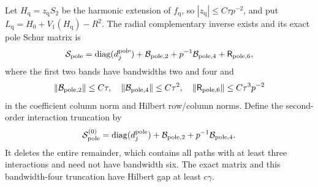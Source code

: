 \begin{lemma}\label{inf:centre-form-comparison}
Let $H_{\mathrm q}=z_{\mathrm q}S_2$ be the harmonic extension of
$f_{\mathrm q}$, so $|z_{\mathrm q}|\le C\tau p^{-2}$, and put
$L_{\mathrm q}=H_0+V_1(H_{\mathrm q})-R^2$.
The radial complementary inverse exists and its exact pole Schur
matrix is
\begin{equation}\label{inf:pole-schur-bands}
 \mathcal S_{\mathrm{pole}}
 =\operatorname{diag}(d_j^{\mathrm{pole}})+\mathcal B_{\mathrm{pole},2}
       +p^{-1}\mathcal B_{\mathrm{pole},4}
       +\mathsf R_{\mathrm{pole},6},
\end{equation}
where the first two bands have bandwidths two and four and
\begin{equation}\label{inf:pole-band-bounds}
 \lVert \mathcal B_{\mathrm{pole},2}\rVert\le C\tau,\quad
 \lVert \mathcal B_{\mathrm{pole},4}\rVert\le C\tau^2,\quad
 \lVert \mathsf R_{\mathrm{pole},6}\rVert\le C\tau^3p^{-2}
\end{equation}
in the coefficient column norm and Hilbert row/column norms.
Define the second-order interaction truncation by
\[
 \mathcal S_{\mathrm{pole}}^{(0)}
 =\operatorname{diag}(d_j^{\mathrm{pole}})+\mathcal B_{\mathrm{pole},2}
                         +p^{-1}\mathcal B_{\mathrm{pole},4}.
\]
It deletes the entire remainder, which contains all paths with
at least three interactions and need not have bandwidth six.
The exact matrix and this bandwidth-four truncation have Hilbert
gap at least $c\gamma$.
\end{lemma}
